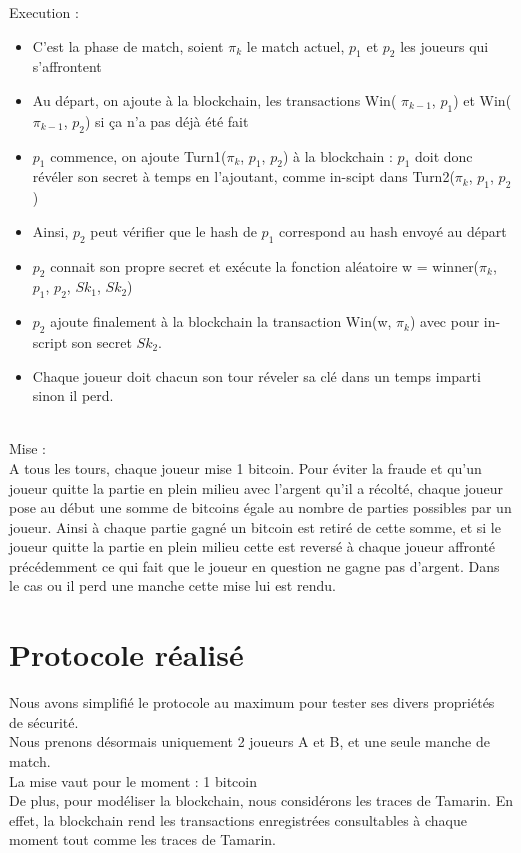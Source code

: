 \documentclass[conference]{IEEEtran}
\begin{document}
Execution :  \\
\begin{itemize}
\item C'est la phase de match, soient $\pi_{k}$ le match actuel, $p_{1}$ et $p_{2}$ les joueurs qui s'affrontent
\item Au départ, on ajoute à la blockchain, les transactions Win( $\pi_{k-1}$, $p_{1}$) et Win( $\pi_{k-1}$, $p_{2}$) si ça n'a pas déjà été fait
\item $p_{1}$ commence, on ajoute Turn1($\pi_{k}$, $p_{1}$, $p_{2}$) à la blockchain :  $p_{1}$ doit donc révéler son secret à temps en l'ajoutant, comme in-scipt dans Turn2($\pi_{k}$, $p_{1}$, $p_{2}$)
\item Ainsi, $p_{2}$ peut vérifier que le hash de $p_{1}$ correspond au hash envoyé au départ
\item $p_{2}$ connait son propre secret et exécute la fonction aléatoire w = winner($\pi_{k}$, $p_{1}$, $p_{2}$, $Sk_{1}$, $Sk_{2}$)
\item $p_{2}$ ajoute finalement à la blockchain la transaction Win(w, $\pi_{k}$) avec pour in-script son secret $Sk_{2}$.
\item Chaque joueur doit chacun son tour réveler sa clé dans un temps imparti sinon il perd. \\
\end{itemize}
\\
Mise : \\
 A tous les tours, chaque joueur mise 1 bitcoin. Pour éviter la fraude et qu'un joueur quitte la partie en plein milieu avec l'argent qu'il a récolté, chaque joueur pose au début une somme de bitcoins égale au nombre de parties possibles par un joueur. Ainsi à chaque partie gagné un bitcoin est retiré de cette somme, et si le joueur quitte la partie en plein milieu cette est reversé à chaque joueur affronté précédemment ce qui fait que le joueur en question ne gagne pas d'argent. Dans le cas ou il perd une manche cette mise lui est rendu.

\section{Protocole réalisé}
Nous avons simplifié le protocole au maximum pour tester ses divers propriétés de sécurité. \\
Nous prenons désormais uniquement 2 joueurs A et B, et une seule manche de match. \\
La mise vaut pour le moment : 1 bitcoin \\
De plus, pour modéliser la blockchain, nous considérons les traces de Tamarin. En effet, la blockchain rend les transactions enregistrées consultables à chaque moment tout comme les traces de Tamarin.
\end{document}
